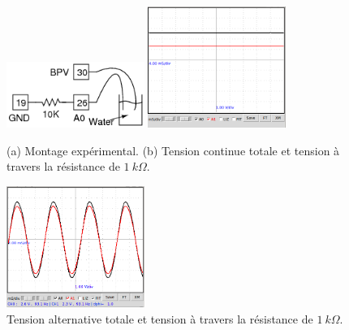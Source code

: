 \documentclass{book}
\begin{document}
\begin{figure}[h!]
\begin{center}
\caption{\label{}(a) Montage expérimental. (b) Tension continue totale et tension à travers la résistance de $1\ k\Omega$. }\vspace{0.5em}
\includegraphics[width=0.4\textwidth, height=0.3\textwidth, keepaspectratio]{Schematic-water.png}
\includegraphics[width=0.4\textwidth, height=0.3\textwidth, keepaspectratio]{Pic-DCthrough-water.png}
\end{center}
\end{figure}



\begin{figure}[h!]
\begin{center}
\caption{\label{}Tension alternative totale et tension à travers la résistance de $1\ k\Omega$. }\vspace{0.5em}
\includegraphics[width=0.4\textwidth, height=0.3\textwidth, keepaspectratio]{Pic-ACthrough-water.png}
\end{center}
\end{figure}
\end{document}

